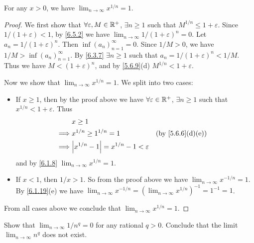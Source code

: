 \begin{lem}\label{6.5.3}
  For any \(x > 0\), we have \(\lim_{n \to \infty} x^{1 / n} = 1\).
\end{lem}

\begin{proof}
  We first show that \(\forall \varepsilon, M \in \mathbb{R}^+\), \(\exists n \geq 1\) such that \(M^{1 / n} \leq 1 + \varepsilon\).
  Since \(1 / (1 + \varepsilon) < 1\), by \cref{6.5.2} we have \(\lim_{n \to \infty} 1 / (1 + \varepsilon)^n = 0\).
  Let \(a_n = 1 / (1 + \varepsilon)^n\).
  Then \(\inf(a_n)_{n = 1}^\infty = 0\).
  Since \(1 / M > 0\), we have \(1 / M > \inf(a_n)_{n = 1}^\infty\).
  By \cref{6.3.7} \(\exists n \geq 1\) such that \(a_n = 1 / (1 + \varepsilon)^n < 1 / M\).
  Thus we have \(M < (1 + \varepsilon)^n\), and by \cref{5.6.9}(d) \(M^{1 / n} < 1 + \varepsilon\).

  Now we show that \(\lim_{n \to \infty} x^{1 / n} = 1\).
  We split into two cases:
  \begin{itemize}
    \item If \(x \geq 1\), then by the proof above we have \(\forall \varepsilon \in \mathbb{R}^+\), \(\exists n \geq 1\) such that \(x^{1 / n} < 1 + \varepsilon\).
          Thus
          \begin{align*}
                     & x \geq 1                                                                              \\
            \implies & x^{1 / n} \geq 1^{1 / n} = 1                      &  & \text{(by \cref{5.6.6}(d)(e))} \\
            \implies & \abs{x^{1 / n} - 1} = x^{1 / n} - 1 < \varepsilon
          \end{align*}
          and by \cref{6.1.8} \(\lim_{n \to \infty} x^{1 / n} = 1\).
    \item If \(x < 1\), then \(1 / x > 1\).
          So from the proof above we have \(\lim_{n \to \infty} x^{-1 / n} = 1\).
          By \cref{6.1.19}(e) we have \(\lim_{n \to \infty} x^{-1 / n} = (\lim_{n \to \infty} x^{1 / n})^{-1} = 1^{-1} = 1\).
  \end{itemize}
  From all cases above we conclude that \(\lim_{n \to \infty} x^{1 / n} = 1\).
\end{proof}

\exercisesection

\begin{ex}\label{ex:6.5.1}
  Show that \(\lim_{n \to \infty} 1 / n^q = 0\) for any rational \(q > 0\).
  Conclude that the limit \(\lim_{n \to \infty} n^q\) does not exist.
\end{ex}


